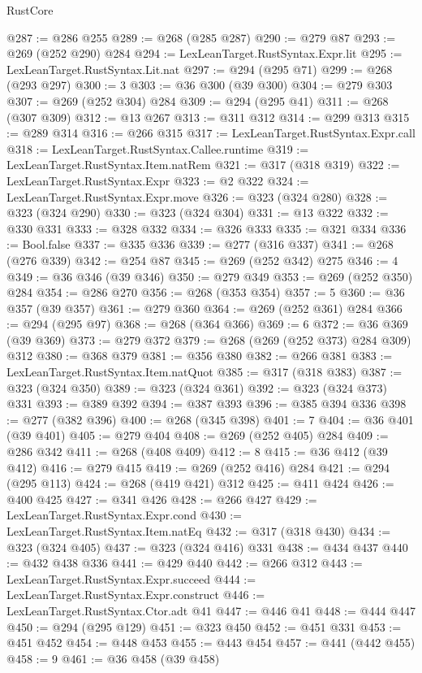 \begin{lexlean}{RustCore}
\begin{coremodule}
@287 := @286 @255
@289 := @268 (@285 @287)
@290 := @279 @87
@293 := @269 (@252 @290) @284
@294 := LexLeanTarget.RustSyntax.Expr.lit
@295 := LexLeanTarget.RustSyntax.Lit.nat
@297 := @294 (@295 @71)
@299 := @268 (@293 @297)
@300 := 3
@303 := @36 @300 (@39 @300)
@304 := @279 @303
@307 := @269 (@252 @304) @284
@309 := @294 (@295 @41)
@311 := @268 (@307 @309)
@312 := @13 @267
@313 := @311 @312
@314 := @299 @313
@315 := @289 @314
@316 := @266 @315
@317 := LexLeanTarget.RustSyntax.Expr.call
@318 := LexLeanTarget.RustSyntax.Callee.runtime
@319 := LexLeanTarget.RustSyntax.Item.natRem
@321 := @317 (@318 @319)
@322 := LexLeanTarget.RustSyntax.Expr
@323 := @2 @322
@324 := LexLeanTarget.RustSyntax.Expr.move
@326 := @323 (@324 @280)
@328 := @323 (@324 @290)
@330 := @323 (@324 @304)
@331 := @13 @322
@332 := @330 @331
@333 := @328 @332
@334 := @326 @333
@335 := @321 @334
@336 := Bool.false
@337 := @335 @336
@339 := @277 (@316 @337)
@341 := @268 (@276 @339)
@342 := @254 @87
@345 := @269 (@252 @342) @275
@346 := 4
@349 := @36 @346 (@39 @346)
@350 := @279 @349
@353 := @269 (@252 @350) @284
@354 := @286 @270
@356 := @268 (@353 @354)
@357 := 5
@360 := @36 @357 (@39 @357)
@361 := @279 @360
@364 := @269 (@252 @361) @284
@366 := @294 (@295 @97)
@368 := @268 (@364 @366)
@369 := 6
@372 := @36 @369 (@39 @369)
@373 := @279 @372
@379 := @268 (@269 (@252 @373) @284 @309) @312
@380 := @368 @379
@381 := @356 @380
@382 := @266 @381
@383 := LexLeanTarget.RustSyntax.Item.natQuot
@385 := @317 (@318 @383)
@387 := @323 (@324 @350)
@389 := @323 (@324 @361)
@392 := @323 (@324 @373) @331
@393 := @389 @392
@394 := @387 @393
@396 := @385 @394 @336
@398 := @277 (@382 @396)
@400 := @268 (@345 @398)
@401 := 7
@404 := @36 @401 (@39 @401)
@405 := @279 @404
@408 := @269 (@252 @405) @284
@409 := @286 @342
@411 := @268 (@408 @409)
@412 := 8
@415 := @36 @412 (@39 @412)
@416 := @279 @415
@419 := @269 (@252 @416) @284
@421 := @294 (@295 @113)
@424 := @268 (@419 @421) @312
@425 := @411 @424
@426 := @400 @425
@427 := @341 @426
@428 := @266 @427
@429 := LexLeanTarget.RustSyntax.Expr.cond
@430 := LexLeanTarget.RustSyntax.Item.natEq
@432 := @317 (@318 @430)
@434 := @323 (@324 @405)
@437 := @323 (@324 @416) @331
@438 := @434 @437
@440 := @432 @438 @336
@441 := @429 @440
@442 := @266 @312
@443 := LexLeanTarget.RustSyntax.Expr.succeed
@444 := LexLeanTarget.RustSyntax.Expr.construct
@446 := LexLeanTarget.RustSyntax.Ctor.adt @41
@447 := @446 @41
@448 := @444 @447
@450 := @294 (@295 @129)
@451 := @323 @450
@452 := @451 @331
@453 := @451 @452
@454 := @448 @453
@455 := @443 @454
@457 := @441 (@442 @455)
@458 := 9
@461 := @36 @458 (@39 @458)

\end{coremodule}
\end{lexlean}
